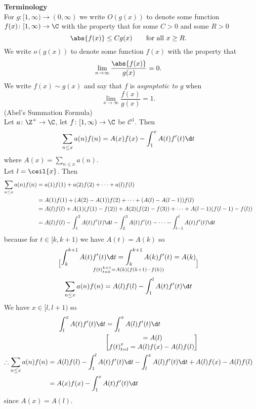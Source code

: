 \textbf{Terminology} \\
For $g\colon[1,\infty)\to(0,\infty)$ we write $O(g(x))$ to denote some function $f(x)\colon[1,\infty)\to\C$ with the property that for some $C>0$ and some $R>0$
\[ \abs{f(x)} \leq C g(x) \qquad \text{for all $x\geq R$} . \]
We write $o(g(x))$ to denote some function $f(x)$ with the property that
\[ \lim_{n\to\infty}\frac{\abs{f(x)}}{g(x)} = 0 . \]
We write $f(x)\sim g(x)$ and say that $f$ is \emph{asymptotic to\/ $g$} when
\[ \lim_{x\to\infty}\frac{f(x)}{g(x)} = 1 . \]
\thm (Abel's Summation Formula) \\
Let $a\colon\Z^+\to\C$, let $f\colon[1,\infty)\to\C$ be $\mathcal{C}^1$.  Then
\[ \sum_{n\leq x}a(n)f(n) = A(x)f(x) - \int_1^x A(t)f'(t)\d t \]
where $A(x)=\sum_{n\leq x}a(n)$. \\
\pf Let $l=\ceil{x}$.  Then
\begin{align*}
\sum_{n\leq x}a(n)f(n) &= a(1)f(1) + a(2)f(2) + \dotsb + a(l)f(l) \\
&= A(1)f(1) + (A(2)-A(1))f(2) + \dotsb + (A(l)-A(l-1))f(l) \\
&= A(l)f(l) + A(1)(f(1)-f(2)) + A(2)(f(2)-f(3)) + \dotsb + A(l-1)(f(l-1)-f(l)) \\
&= A(l)f(l) - \int_1^2 A(t)f'(t)\d t - \int_2^3 A(t)f'(t) - \dotsb - \int_{l-1}^l A(t) f'(t) \d t
\end{align*}
because for $t\in[k,k+1)$ we have $A(t)=A(k)$ so
\[ \int_k^{k+1}A(t)f'(t)\d t = \int_k^{k+1}A(k)f'(t) = A(k)\brack{f(t)}_{t=k}^{k+1} = A(k)(f(k+1)-f(k)) \]
\[ \sum_{n\leq x} a(n)f(n) = A(l)f(l) - \int_1^l A(t)f'(t)\d t \]
We have $x\in[l,l+1)$ so
\begin{gather*}\begin{aligned}
\int_l^x A(t) f'(t) \d t &= \int_l^x A(l)f'(t)\d t \\
&= A(l)\brack{f(t)}_{t=l}^x = A(l)f(x) - A(l)f(l)
\end{aligned}\\
\begin{aligned}
\therefore \sum_{n\leq x} a(n)f(n) &= A(l)f(l) - \int_1^l A(t)f'(t)\d t - \int_l^x A(l)f'(t)\d t + A(l)f(x) - A(l)f(l) \\
&= A(x)f(x) - \int_1^x A(t)f'(t)\d t
\end{aligned}\end{gather*}
since $A(x)=A(l)$.
